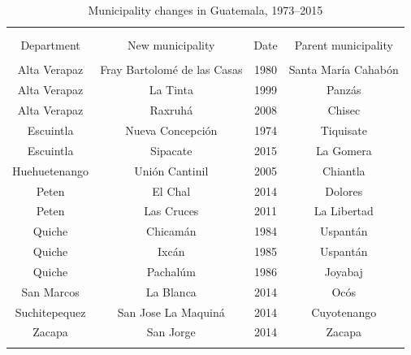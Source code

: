 \documentclass[a4paper, 12pt, notitlepage]{article}
\begin{document}
\begin{table}[!htbp] \centering
  \caption{Municipality changes in Guatemala, 1973--2015}
  \label{tab:muni}
  \small
  \begin{tabular}{cccc}
  \\[-1.8ex]\hline
  \hline \\[-1.8ex]
  \\[-1.8ex]
  Department      & New municipality                & Date      & Parent municipality \\
  \hline \\[-1.8ex]
  Alta Verapaz    & Fray Bartolomé de las Casas     & 1980      & Santa María Cahabón \\
  Alta Verapaz    &                    La Tinta     & 1999      &              Panzás \\
  Alta Verapaz    &                     Raxruhá     & 2008      &              Chisec \\
  Escuintla       &            Nueva Concepción     & 1974      &           Tiquisate \\
  Escuintla       &                    Sipacate     & 2015      &           La Gomera \\
  Huehuetenango   &              Unión Cantinil     & 2005      &            Chiantla \\
  Peten           &                     El Chal     & 2014      &             Dolores \\
  Peten           &                  Las Cruces     & 2011      &         La Libertad \\
  Quiche          &                    Chicamán     & 1984      &            Uspantán \\
  Quiche          &                       Ixcán     & 1985      &            Uspantán \\
  Quiche          &                    Pachalúm     & 1986      &             Joyabaj \\
  San Marcos      &                   La Blanca     & 2014      &                Ocós \\
  Suchitepequez   &         San Jose La Maquiná     & 2014      &         Cuyotenango \\
  Zacapa          &                   San Jorge     & 2014      &              Zacapa \\
  \hline
  \hline \\[-1.8ex]
  \end{tabular}
\end{table}
\end{document}

